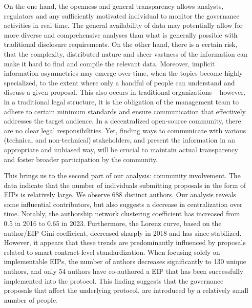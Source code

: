 \documentclass[No]{AEA}
\begin{document}
On the one hand, the openness and general transparency allows analysts, regulators and any sufficiently motivated individual to monitor the governance activities in real time. The general availability of data may potentially allow for more diverse and comprehensive analyses than what is generally possible with traditional disclosure requirements. On the other hand, there is a certain risk, that the complexity, distributed nature and sheer vastness of the information can make it hard to find and compile the relevant data. Moreover, implicit information asymmetries may emerge over time, when the topics become highly specialized, to the extent where only a handful of people can understand and discuss a given proposal. 
This also occurs in traditional organizations -- however, in a traditional legal structure, it is the obligation of the management team to adhere to certain minimum standards and ensure communication that effectively addresses the target audience. In a decentralized open-source community, there are no clear legal responsibilities. Yet, finding ways to communicate with various (technical and non-technical) stakeholders, and present the information in an appropriate and unbiased way, will be crucial to maintain actual transparency and foster broader participation by the community. 

This brings us to the second part of our analysis: community involvement. The data indicate that the number of individuals submitting proposals in the form of EIPs is relatively large. We observe 688 distinct authors. Our analysis reveals some influential contributors, but also suggests a decrease in centralization over time. Notably, the authorship network clustering coefficient has increased from 0.5 in 2016 to 0.65 in 2023. Furthermore, the Lorenz curve, based on the author/EIP Gini-coefficient, decreased sharply in 2018 and has since stabilized. 
However, it appears that these trends are predominantly influenced by proposals related to smart contract-level standardization. When focusing solely on implementable EIPs, the number of authors decreases significantly to 130 unique authors, and only 54 authors have co-authored a EIP that has been successfully implemented into the protocol. This finding suggests that the governance proposals that affect the underlying protocol, are introduced by a relatively small number of people. 
\end{document}
